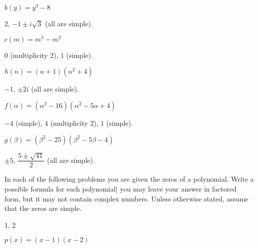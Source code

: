\begin{exercises}
\begin{problem}[Zeros]
\begin{multicols}{3}
\begin{subproblem}
 			$b(y)=y^3-8$
 			\begin{shortsolution}
 				$2$, $-1\pm i\sqrt{3}$ (all are simple).
 			\end{shortsolution}
 		\end{subproblem}
 		\begin{subproblem}
 			$c(m)=m^3-m^2$
 			\begin{shortsolution}
 				$0$ (multiplicity $2$), $1$ (simple).
 			\end{shortsolution}
 		\end{subproblem}
 		\begin{subproblem}
 			$h(n)=(n+1)(n^2+4)$
 			\begin{shortsolution}
 				$-1$, $\pm 2i$ (all are simple).
 			\end{shortsolution}
 		\end{subproblem}
 		\begin{subproblem}
 			$f(\alpha)=(\alpha^2-16)(\alpha^2-5\alpha+4)$
 			\begin{shortsolution}
 				$-4$ (simple), $4$ (multiplicity $2$), $1$ (simple).
 			\end{shortsolution}
 		\end{subproblem}
 		\begin{subproblem}
 			$g(\beta)=(\beta^2-25)(\beta^2-5\beta-4)$
 			\begin{shortsolution}
 				$\pm 5$, $\dfrac{5\pm\sqrt{41}}{2}$ (all are simple).
 			\end{shortsolution}
 		\end{subproblem}
 	\end{multicols}
 	\end{problem}
 	\begin{problem}
 	In each of the following problems you are given the zeros of a polynomial.
 	Write a possible formula for each polynomial| you may leave your
 	answer in factored form, but it may not contain complex numbers. Unless
 	otherwise stated, assume that the zeros are simple.
 	\begin{multicols}{3}
 		\begin{subproblem}
 			$1$, $2$
 			\begin{shortsolution}
 				$p(x)=(x-1)(x-2)$
 			\end{shortsolution}
 		\end{subproblem}
 		\begin{subproblem}

\end{subproblem}
\end{multicols}
\end{problem}
\end{exercises}
